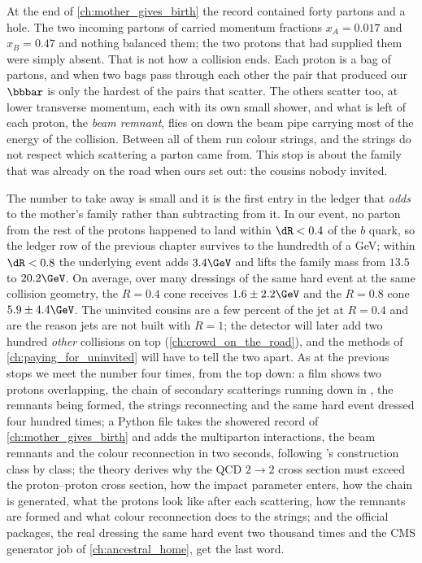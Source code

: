 At the end of \cref{ch:mother_gives_birth} the record contained forty
partons and a hole. The two incoming partons of  carried
momentum fractions $x_A=0.017$ and $x_B=0.47$ and nothing balanced them;
the two protons that had supplied them were simply absent. That is not how
a collision ends. Each proton is a bag of partons, and when two bags pass
through each other the pair that produced our $\bbbar$ is only the hardest
of the pairs that scatter. The others scatter too, at lower transverse
momentum, each with its own small shower, and what is left of each proton,
the \emph{beam remnant}, flies on down the beam pipe carrying most of the
energy of the collision. Between all of them run colour strings, and the
strings do not respect which scattering a parton came from. This stop is
about the family that was already on the road when ours set out: the
cousins nobody invited.

The number to take away is small and it is the first entry in the ledger
that \emph{adds} to the mother's family rather than subtracting from it. In
our event, no parton from the rest of the protons happened to land within
$\dR<0.4$ of the $b$ quark, so the ledger row of the previous chapter
survives to the hundredth of a GeV; within $\dR<0.8$ the underlying event
adds $3.4\GeV$ and lifts the family mass from $13.5$ to $20.2\GeV$. On
average, over many dressings of the same hard event at the same collision
geometry, the $R=0.4$ cone receives $1.6\pm2.2\GeV$ and the $R=0.8$ cone
$5.9\pm4.4\GeV$. The uninvited cousins are a few percent of the jet at
$R=0.4$ and are the reason jets are not built with $R=1$; the detector will
later add two hundred \emph{other} collisions on top
(\cref{ch:crowd_on_the_road}), and the methods of
\cref{ch:paying_for_uninvited} will have to tell the two apart. As at the
previous stops we meet the number four times, from the top down: a film
shows two protons overlapping, the chain of secondary scatterings running
down in \pt, the remnants being formed, the strings reconnecting and the
same hard event dressed four hundred times; a Python file takes the
showered record of \cref{ch:mother_gives_birth} and adds the multiparton
interactions, the beam remnants and the colour reconnection in two seconds,
following \PYTHIA's construction class by class; the theory derives why the
QCD $2\to2$ cross section must exceed the proton--proton cross section, how
the impact parameter enters, how the chain is generated, what the protons
look like after each scattering, how the remnants are formed and what
colour reconnection does to the strings; and the official packages, the
real \PYTHIA dressing the same hard event two thousand times and the CMS
generator job of \cref{ch:ancestral_home}, get the last word.

